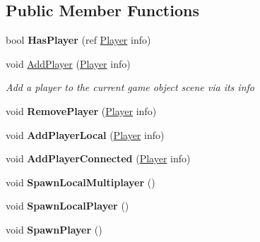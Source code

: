 \subsection*{Public Member Functions}
\begin{DoxyCompactItemize}
\item 
\hypertarget{class_game_state_a05acc40696378ba026165a2cc824acf0}{bool {\bfseries Has\-Player} (ref \hyperlink{class_game_state_1_1_player}{Player} info)}\label{class_game_state_a05acc40696378ba026165a2cc824acf0}

\item 
void \hyperlink{class_game_state_a4c4e32237639764263332c7c236974d1}{Add\-Player} (\hyperlink{class_game_state_1_1_player}{Player} info)
\begin{DoxyCompactList}\small\item\em Add a player to the current game object scene via its info \end{DoxyCompactList}\item 
\hypertarget{class_game_state_ae8d21ce826daada0dabeadd11c6eb233}{void {\bfseries Remove\-Player} (\hyperlink{class_game_state_1_1_player}{Player} info)}\label{class_game_state_ae8d21ce826daada0dabeadd11c6eb233}

\item 
\hypertarget{class_game_state_a1e3c3340e55693af1c8326879a81f1c4}{void {\bfseries Add\-Player\-Local} (\hyperlink{class_game_state_1_1_player}{Player} info)}\label{class_game_state_a1e3c3340e55693af1c8326879a81f1c4}

\item 
\hypertarget{class_game_state_a2e6cdef311e93ec46d07206d621f6837}{void {\bfseries Add\-Player\-Connected} (\hyperlink{class_game_state_1_1_player}{Player} info)}\label{class_game_state_a2e6cdef311e93ec46d07206d621f6837}

\item 
\hypertarget{class_game_state_a61e4817740bd283ce4a6ea44e0d0f00a}{void {\bfseries Spawn\-Local\-Multiplayer} ()}\label{class_game_state_a61e4817740bd283ce4a6ea44e0d0f00a}

\item 
\hypertarget{class_game_state_a82b88c45043a403441d3eef1e0b72266}{void {\bfseries Spawn\-Local\-Player} ()}\label{class_game_state_a82b88c45043a403441d3eef1e0b72266}

\item 
\hypertarget{class_game_state_af2fbb55979f8cc6da50317e1d701e370}{void {\bfseries Spawn\-Player} ()}\label{class_game_state_af2fbb55979f8cc6da50317e1d701e370}


\end{DoxyCompactItemize}
